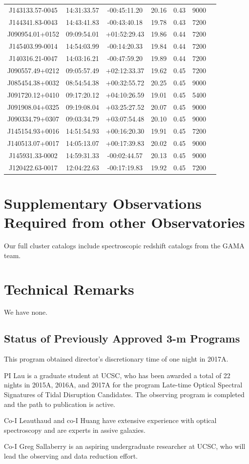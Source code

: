 \documentclass[letterpaper,12pt]{article}
\begin{document}
\begin{table}
\begin{tabular}{ccccccc}
J143133.57-0045 & 14:31:33.57 & -00:45:11.20 & 20.16 & 0.43 & 9000 \\
J144341.83-0043 & 14:43:41.83 & -00:43:40.18 & 19.78 & 0.43 & 7200 \\
J090954.01+0152 & 09:09:54.01 & +01:52:29.43 & 19.86 & 0.44 & 7200 \\
J145403.99-0014 & 14:54:03.99 & -00:14:20.33 & 19.84 & 0.44 & 7200 \\
J140316.21-0047 & 14:03:16.21 & -00:47:59.20 & 19.89 & 0.44 & 7200 \\
J090557.49+0212 & 09:05:57.49 & +02:12:33.37 & 19.62 & 0.45 & 7200 \\
J085454.38+0032 & 08:54:54.38 & +00:32:55.72 & 20.25 & 0.45 & 9000 \\
J091720.12+0410 & 09:17:20.12 & +04:10:26.59 & 19.01 & 0.45 & 5400 \\
J091908.04+0325 & 09:19:08.04 & +03:25:27.52 & 20.07 & 0.45 & 9000 \\
J090334.79+0307 & 09:03:34.79 & +03:07:54.48 & 20.10 & 0.45 & 9000 \\
J145154.93+0016 & 14:51:54.93 & +00:16:20.30 & 19.91 & 0.45 & 7200 \\
J140513.07+0017 & 14:05:13.07 & +00:17:39.83 & 20.02 & 0.45 & 9000 \\
J145931.33-0002 & 14:59:31.33 & -00:02:44.57 & 20.13 & 0.45 & 9000 \\
J120422.63-0017 & 12:04:22.63 & -00:17:19.83 & 19.92 & 0.45 & 7200 \\
\hline
\end{tabular}
\end{table}

\section{Supplementary Observations Required from other Observatories}

Our full cluster catalogs include spectroscopic redshift catalogs from the GAMA team. 

\section{Technical Remarks}

We have none. 

\subsection{Status of Previously Approved 3-m Programs}

This program obtained director's discretionary time of one night in 2017A.

PI Lau is a graduate student at UCSC, who has been awarded a total of 22 nights in 2015A, 2016A, 
and 2017A for the program Late-time Optical Spectral Signatures of Tidal Disruption Candidates. 
The observing program is completed and the path to publication is active. 

Co-I Leauthaud and co-I Huang have extensive experience with optical spectroscopy and are experts 
in assive galaxies. 

Co-I Greg Sallaberry is an aspiring undergraduate researcher at UCSC, who will lead the observing 
and data reduction effort. 
\end{document}
